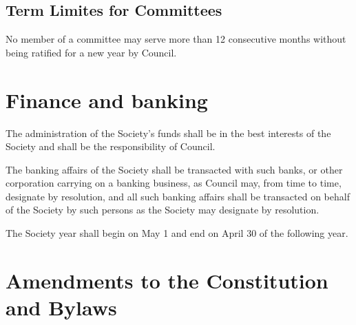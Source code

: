 \subsection{Term Limites for Committees}
	\begin{longenum}[label*=\thesubsection.\arabic*., align=left]
	\item No member of a committee may serve more than 12 consecutive months without being ratified for a new year by Council.
\end{longenum}
\newpage

\section{Finance and banking}

	\begin{longenum}[label*=\thesection.\arabic*., align=left]
	\item The administration of the Society's funds shall be in the best interests of the Society and shall be the responsibility of Council.
    \item The banking affairs of the Society shall be transacted with such banks, or other corporation carrying on a banking business, as Council may, from time to time, designate by resolution, and all such banking affairs shall be transacted on behalf of the Society by such persons as the Society may designate by resolution. 
    \item The Society year shall begin on May 1 and end on April 30 of the following year. 
\end{longenum}
\renewcommand*{\theenumi}{\thesubsection.\arabic{enumi}}

\newpage

\section {Amendments to the Constitution and Bylaws}

